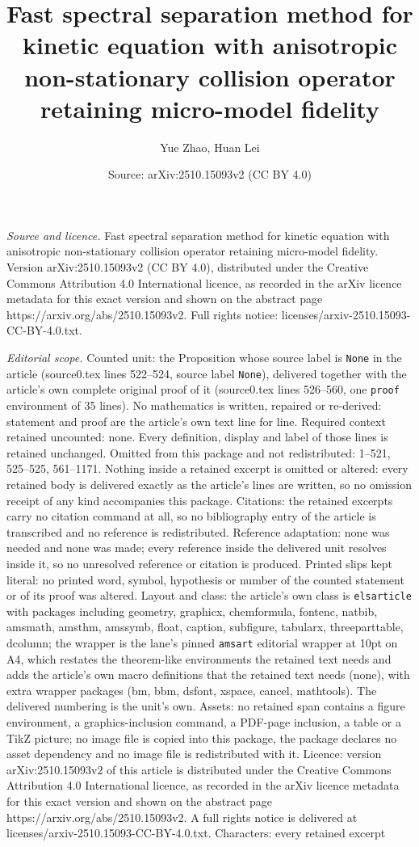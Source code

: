 \documentclass[10pt,a4paper]{amsart}
\title[Fast spectral separation method for kinetic equation with an]{Fast spectral separation method for kinetic equation with anisotropic non-stationary collision operator retaining micro-model fidelity}
\author{Yue Zhao, Huan Lei}
\date{Source: arXiv:2510.15093v2 (CC BY 4.0)}
\begin{document}
\maketitle

\noindent\emph{Source and licence.} Fast spectral separation method for kinetic equation with anisotropic non-stationary collision operator retaining micro-model fidelity. Version arXiv:2510.15093v2 (CC BY 4.0), distributed under the Creative Commons Attribution 4.0 International licence, as recorded in the arXiv licence metadata for this exact version and shown on the abstract page https://arxiv.org/abs/2510.15093v2. Full rights notice: licenses/arxiv-2510.15093-CC-BY-4.0.txt.\par\smallskip

\noindent\textit{Editorial scope.} Counted unit: the Proposition whose source label is \texttt{None} in the article (source0.tex lines 522--524, source label \texttt{None}), delivered together with the article's own complete original proof of it (source0.tex lines 526--560, one \texttt{proof} environment of 35 lines). No mathematics is written, repaired or re-derived: statement and proof are the article's own text line for line. Required context retained uncounted: none. Every definition, display and label of those lines is retained unchanged. Omitted from this package and not redistributed: 1--521, 525--525, 561--1171. Nothing inside a retained excerpt is omitted or altered: every retained body is delivered exactly as the article's lines are written, so no omission receipt of any kind accompanies this package. Citations: the retained excerpts carry no citation command at all, so no bibliography entry of the article is transcribed and no reference is redistributed. Reference adaptation: none was needed and none was made; every reference inside the delivered unit resolves inside it, so no unresolved reference or citation is produced. Printed slips kept literal: no printed word, symbol, hypothesis or number of the counted statement or of its proof was altered. Layout and class: the article's own class is \texttt{elsarticle} with packages including geometry, graphicx, chemformula, fontenc, natbib, amsmath, amsthm, amssymb, float, caption, subfigure, tabularx, threeparttable, dcolumn; the wrapper is the lane's pinned \texttt{amsart} editorial wrapper at 10pt on A4, which restates the theorem-like environments the retained text needs and adds the article's own macro definitions that the retained text needs (none), with extra wrapper packages (bm, bbm, dsfont, xspace, cancel, mathtools). The delivered numbering is the unit's own. Assets: no retained span contains a figure environment, a graphics-inclusion command, a PDF-page inclusion, a table or a TikZ picture; no image file is copied into this package, the package declares no asset dependency and no image file is redistributed with it. Licence: version arXiv:2510.15093v2 of this article is distributed under the Creative Commons Attribution 4.0 International licence, as recorded in the arXiv licence metadata for this exact version and shown on the abstract page https://arxiv.org/abs/2510.15093v2. A full rights notice is delivered at licenses/arxiv-2510.15093-CC-BY-4.0.txt. Characters: every retained excerpt 
\end{document}
